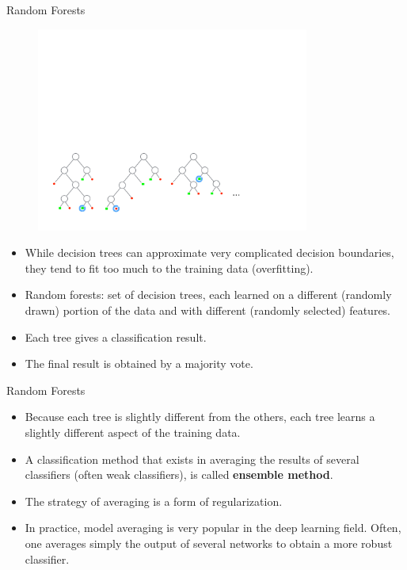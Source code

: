 \documentclass[xcolor=pdftex,dvipsnames,table]{beamer}
\begin{document}
\begin{frame}{Random Forests}
\begin{figure}[htb]
\includegraphics[width=0.8\textwidth]{../graphics/Forest.pdf}
\end{figure}
\begin{itemize}
	\item While decision trees can approximate very complicated decision boundaries, they tend to fit too much to the training data (overfitting).
	\item Random forests: set of decision trees, each learned on a different (randomly drawn) portion of the data and with different (randomly selected) features.
	\item Each tree gives a classification result.
	\item The final result is obtained by a majority vote.
\end{itemize}
\end{frame}

\begin{frame}{Random Forests}
\begin{itemize}
	\item Because each tree is slightly different from the others, each tree learns a slightly different aspect of the training data.
	\item A classification method that exists in averaging the results of several classifiers (often weak classifiers), is called {\bf ensemble method}.
	\item The strategy of averaging is a form of regularization.
	\item In practice, model averaging is very popular in the deep learning field. Often, one averages simply the output of several networks to obtain a more robust classifier.
\end{itemize}
\end{frame}
\end{document}
